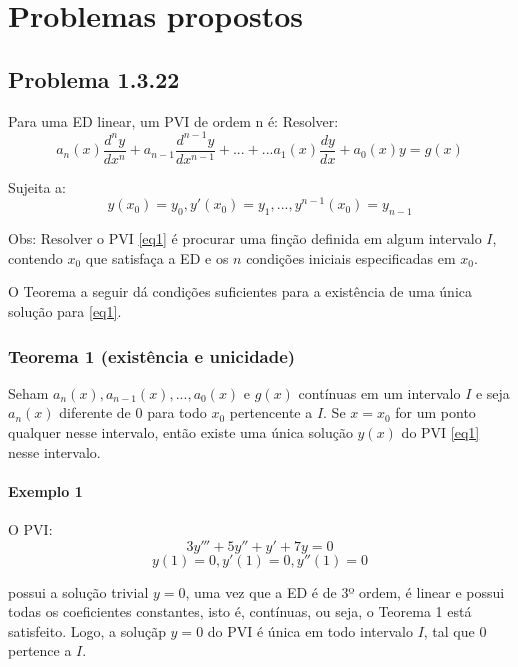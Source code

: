 \setcounter{topnumber}{5}
\setcounter{bottomnumber}{5}
\setcounter{totalnumber}{5}

\chapter{Problemas propostos}

\section{Problema 1.3.22}
Para uma ED linear, um PVI de ordem n é:
Resolver:
\begin{equation*}
a_{n}(x) \frac{d^{n}y}{dx^{n}} + a_{n-1} \frac{d^{n-1}y}{dx^{n-1}} + ... + ... a_{1}(x) \frac{dy}{dx} + a_{0}(x)y = g(x)
\end{equation*}

Sujeita a:
\begin{equation}\label{eq1}
y(x_{0}) = y_{0}, y'(x_{0}) = y_{1}, ... , y^{n-1}(x_{0}) = y_{n-1} 
\end{equation}

Obs: Resolver o PVI \eqref{eq1} é procurar uma finção definida em algum intervalo $I$, contendo $x_{0}$ que satisfaça a ED e os $n$ condições iniciais especificadas em $x_{0}$.

O Teorema a seguir dá condições suficientes para a existência de uma única solução para \eqref{eq1}.

\subsection{Teorema 1 (existência e unicidade)}
Seham $a_{n}(x), a_{n-1}(x), ... , a_{0}(x)$ e $g(x)$ contínuas em um intervalo $I$ e seja $a_{n}(x)$ diferente de $0$ para todo $x_{0}$ pertencente a $I$.
Se $x = x_{0}$ for um ponto qualquer nesse intervalo, então existe uma única solução $y(x)$ do PVI \eqref{eq1} nesse intervalo.

\subsubsection{Exemplo 1}
O PVI:
\begin{equation}\label{exemplo1}
3y''' + 5y'' + y' + 7y = 0
\end{equation} 
\begin{equation}\label{exemplo1.2}
y(1) = 0, y'(1) = 0, y''(1) = 0
\end{equation}

possui a solução trivial $y=0$, uma vez que a ED é de 3º ordem, é linear e possui todas os coeficientes constantes, isto é, contínuas, ou seja, o Teorema 1 está satisfeito. Logo, a soluçãp $y = 0 $ do PVI é única em todo intervalo $I$, tal que 0 pertence a $I$.

